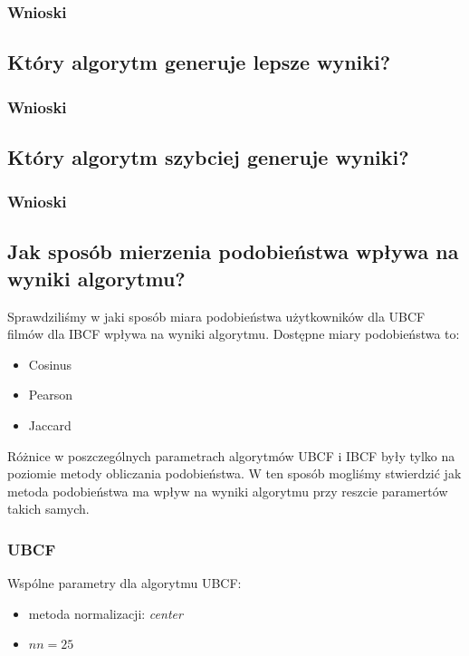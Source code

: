 \documentclass[12pt, a4paper]{article}
\begin{document}
\subsubsection{Wnioski}

\subsection{Który algorytm generuje lepsze wyniki?}

\subsubsection{Wnioski}

\subsection{Który algorytm szybciej generuje wyniki?}

\subsubsection{Wnioski}

\subsection{Jak sposób mierzenia podobieństwa wpływa na wyniki algorytmu?}
Sprawdziliśmy w jaki sposób miara podobieństwa użytkowników dla UBCF filmów dla IBCF wpływa na wyniki algorytmu.
Dostępne miary podobieństwa to:
\begin{itemize}
\item Cosinus
\item Pearson
\item Jaccard
\end{itemize}

Różnice w poszczególnych parametrach algorytmów UBCF i IBCF były tylko na poziomie metody obliczania podobieństwa. W ten sposób mogliśmy stwierdzić jak metoda podobieństwa ma wpływ na wyniki algorytmu przy reszcie paramertów takich samych. 

\subsubsection{UBCF}
Wspólne parametry dla algorytmu UBCF:
\begin{itemize}
\item metoda normalizacji: \emph{center}
\item $nn = 25$
\end{itemize}
\end{document}
